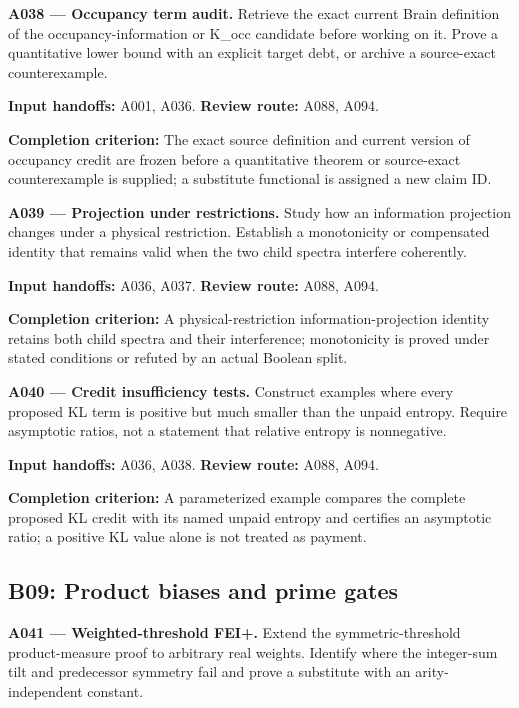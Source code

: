 \documentclass[11pt]{article}
\begin{document}
\textbf{A038 --- Occupancy term audit.} Retrieve the exact current Brain definition of the occupancy-information or K\_occ candidate before working on it. Prove a quantitative lower bound with an explicit target debt, or archive a source-exact counterexample.

{\small\color{ink}\textbf{Input handoffs:} A001, A036. \textbf{Review route:} A088, A094.\par
\textbf{Completion criterion:} The exact source definition and current version of occupancy credit are frozen before a quantitative theorem or source-exact counterexample is supplied; a substitute functional is assigned a new claim ID.\par}



\textbf{A039 --- Projection under restrictions.} Study how an information projection changes under a physical restriction. Establish a monotonicity or compensated identity that remains valid when the two child spectra interfere coherently.

{\small\color{ink}\textbf{Input handoffs:} A036, A037. \textbf{Review route:} A088, A094.\par
\textbf{Completion criterion:} A physical-restriction information-projection identity retains both child spectra and their interference; monotonicity is proved under stated conditions or refuted by an actual Boolean split.\par}



\textbf{A040 --- Credit insufficiency tests.} Construct examples where every proposed KL term is positive but much smaller than the unpaid entropy. Require asymptotic ratios, not a statement that relative entropy is nonnegative.

{\small\color{ink}\textbf{Input handoffs:} A036, A038. \textbf{Review route:} A088, A094.\par
\textbf{Completion criterion:} A parameterized example compares the complete proposed KL credit with its named unpaid entropy and certifies an asymptotic ratio; a positive KL value alone is not treated as payment.\par}



\subsection{B09: Product biases and prime gates}

\textbf{A041 --- Weighted-threshold FEI+.} Extend the symmetric-threshold product-measure proof to arbitrary real weights. Identify where the integer-sum tilt and predecessor symmetry fail and prove a substitute with an arity-independent constant.
\end{document}
